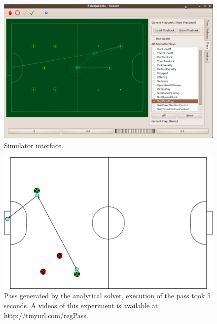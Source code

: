 \documentclass[a4paper, 10pt, conference]{ieeeconf}      %
\begin{document}
\begin{figure}[ht!]
\begin{center}
\includegraphics[totalheight=1.6in]{ui}
\end{center}
\caption{Simulator interface.}
\label{experiment1fig1}
\end{figure}


\begin{figure}[ht!]
\begin{center}
\includegraphics[totalheight=1.6in]{nonoptimized_plan}
\end{center}
\caption{Pass generated by the analytical solver, execution of the pass took 5 seconds. A videos of this experiment is available at http://tinyurl.com/regPass.}
\label{experiment1fig1}
\end{figure}
\end{document}
